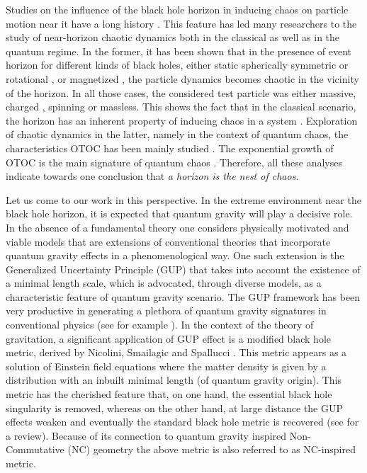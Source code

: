 \documentclass[aps,prd,showpacs,nofootinbib,floats,floatfix,preprintnumbers,groupedaddress,twocolumn]{revtex4-1}
\begin{document}
Studies on the influence of the black hole horizon in inducing chaos on particle motion near it have a long history  \cite{Bombelli:1991eg,Sota:1995ms,Vieira:1996zf,  Suzuki:1996gm,Cornish:1996ri,deMoura:1999wf,Hartl:2002ig,Lei:2020clg,Han:2008zzf,Takahashi:2008zh,Hashimoto:2016dfz,Li:2018wtz,Hashimoto:2018fkb,Dalui:2018qqv,Colangelo:2020tpr}. This feature has led many researchers  to the study of near-horizon chaotic dynamics both in the classical as well as in the quantum regime. In the former, it has been shown that in the presence of event horizon for different kinds of black holes, either  static spherically symmetric \cite{Sota:1995ms,Suzuki:1996gm} or rotational \cite{Hartl:2002ig}, or magnetized \cite{Li:2018wtz}, the particle dynamics becomes chaotic in the vicinity  of the horizon.  In all those cases, the considered test particle was either massive, charged \cite{Lei:2020clg}, spinning \cite{Han:2008zzf,Takahashi:2008zh} or  massless. This shows the fact that in the classical scenario, the horizon has an inherent property of inducing chaos in a system \cite{Bombelli:1991eg,Suzuki:1996gm,Cornish:1996ri,deMoura:1999wf,Takahashi:2008zh}. Exploration of chaotic dynamics in the latter, namely in the context of quantum chaos, the characteristics OTOC has been mainly studied \cite{Maldacena:2015waa,Hashimoto:2017oit}. The exponential growth of OTOC is the main signature of  quantum chaos \cite{Maldacena:2015waa,Hashimoto:2017oit}. Therefore, all these analyses indicate towards one conclusion that \textit{a horizon is the nest of chaos.}

Let us come to our work in this perspective. In the extreme environment near the black hole horizon, it is expected that quantum gravity will play a decisive role. In the absence of  a fundamental theory one considers physically motivated and viable models that are extensions of conventional theories that incorporate quantum gravity effects in a phenomenological way. One such extension is the Generalized Uncertainty Principle (GUP) \cite{kemp} that takes into account the existence of  a minimal length scale, which is advocated, through diverse models, as a characteristic feature   of quantum gravity scenario. The GUP framework has been very productive in generating a plethora of quantum gravity signatures in conventional physics (see for example \cite{rev1,rev2,rev3}). In the context of the theory of gravitation, a significant application of GUP effect is a modified black hole metric, derived by Nicolini, Smailagic and  Spallucci \cite{nic}. This metric appears as a solution of Einstein field equations where the matter density is given by a distribution with an inbuilt minimal length (of quantum gravity origin). This metric has the cherished feature that, on one hand, the essential black hole singularity is removed, whereas on the other hand, at large distance the GUP effects weaken and eventually the standard black hole metric is recovered (see \cite{Nicolini:2008aj} for a review). Because of its connection to quantum gravity inspired Non-Commutative (NC) geometry the above metric \cite{nic} is also referred to as NC-inspired metric.
\end{document}
